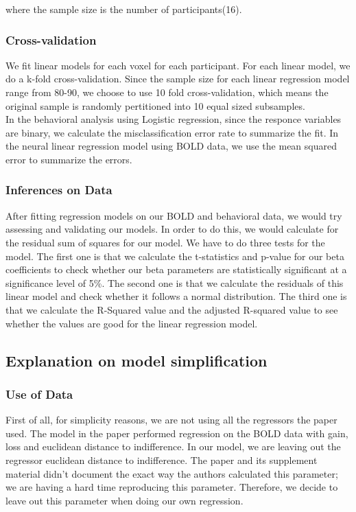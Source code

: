 where the sample size is the number of participants(16).

\subsubsection{Cross-validation}

We fit linear models for each voxel for each participant. For each linear
model, we do a k-fold cross-validation. Since the sample size for each linear 
regression model range from 80-90, we choose to use 10 fold cross-validation,
which means the original sample is randomly pertitioned into 10 equal sized 
subsamples. \\
In the behavioral analysis using Logistic regression, since the responce 
variables are binary, we calculate the misclassification error rate to 
summarize the fit. In the neural linear regression model using BOLD data, we 
use the mean squared error to summarize the errors.

\subsubsection{Inferences on Data}

After fitting regression models on our BOLD and behavioral data, we would try 
assessing and validating our models. In order to do this, we would calculate 
for the residual sum of squares for our model. We have to do three tests for 
the model. The first one is that we calculate the t-statistics and p-value for 
our beta coefficients to check whether our beta parameters are statistically 
significant at a significance level of 5\%. The second one is that we calculate
the residuals of this linear model and check whether it follows a normal 
distribution. The third one is that we calculate the R-Squared value and the 
adjusted R-squared value to see whether the values are good for the linear 
regression model.\\


\subsection{Explanation on model simplification}

\subsubsection{Use of Data}
\indent \indent First of all, for simplicity reasons, we are not using all the 
regressors the paper used. The model in the paper performed regression on the 
BOLD data with gain, loss and euclidean distance to indifference. In our model,
we are leaving out the regressor euclidean distance to indifference. The paper 
and its supplement material didn't document the exact way the authors 
calculated this parameter; we are having a hard time reproducing this 
parameter. Therefore, we decide to leave out this parameter when doing our own 
regression.

